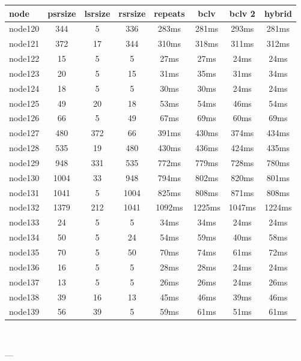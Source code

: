 \begin{tabular}{|l|c|c|c|c|c|c|c|}
\hline node & psrsize & lsrsize & rsrsize   & repeats & bclv & bclv 2 & hybrid\\
    \hline node120 & 344 & 5 & 336 & 283ms & 281ms & 293ms & 281ms\\
    \hline node121 & 372 & 17 & 344 & 310ms & 318ms & 311ms & 312ms\\
    \hline node122 & 15 & 5 & 5 & 27ms & 27ms & 24ms & 24ms\\
    \hline node123 & 20 & 5 & 15 & 31ms & 35ms & 31ms & 34ms\\
    \hline node124 & 18 & 5 & 5 & 30ms & 30ms & 24ms & 24ms\\
    \hline node125 & 49 & 20 & 18 & 53ms & 54ms & 46ms & 54ms\\
    \hline node126 & 66 & 5 & 49 & 67ms & 69ms & 60ms & 69ms\\
    \hline node127 & 480 & 372 & 66 & 391ms & 430ms & 374ms & 434ms\\
    \hline node128 & 535 & 19 & 480 & 430ms & 436ms & 424ms & 435ms\\
    \hline node129 & 948 & 331 & 535 & 772ms & 779ms & 728ms & 780ms\\
    \hline node130 & 1004 & 33 & 948 & 794ms & 802ms & 820ms & 801ms\\
    \hline node131 & 1041 & 5 & 1004 & 825ms & 808ms & 871ms & 808ms\\
    \hline node132 & 1379 & 212 & 1041 & 1092ms & 1225ms & 1047ms & 1224ms\\
    \hline node133 & 24 & 5 & 5 & 34ms & 34ms & 24ms & 24ms\\
    \hline node134 & 50 & 5 & 24 & 54ms & 59ms & 40ms & 58ms\\
    \hline node135 & 70 & 5 & 50 & 70ms & 74ms & 61ms & 72ms\\
    \hline node136 & 16 & 5 & 5 & 28ms & 28ms & 24ms & 24ms\\
    \hline node137 & 13 & 5 & 5 & 26ms & 26ms & 24ms & 26ms\\
    \hline node138 & 39 & 16 & 13 & 45ms & 46ms & 39ms & 46ms\\
    \hline node139 & 56 & 39 & 5 & 59ms & 61ms & 51ms & 61ms\\

\hline
\end{tabular} \

---


